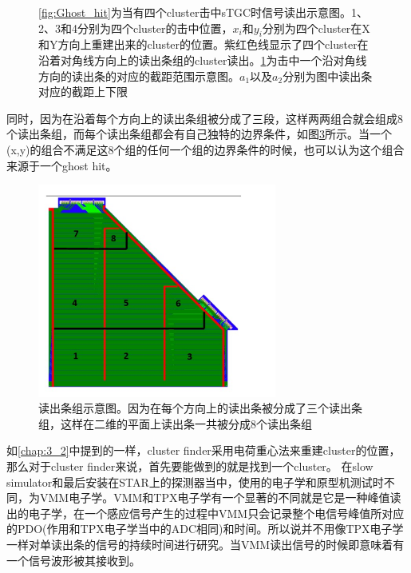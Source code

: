 \begin{figure}[htb]
\begin{subfigure}[b]{0.45\textwidth}
        \caption{}
        \label{fig:Reject_Ghost_Hit}
    \end{subfigure}
    \caption[Ghost hit原理及排除方法示意图]{\ref{fig:Ghost_hit}为当有四个cluster击中sTGC时信号读出示意图。1、2、3和4分别为四个cluster的击中位置，$x_i$和$y_i$分别为四个cluster在X和Y方向上重建出来的cluster的位置。紫红色线显示了四个cluster在沿着对角线方向上的读出条组的cluster读出。\ref{fig:Reject_Ghost_Hit}为击中一个沿对角线方向的读出条的对应的截距范围示意图。$a_1$以及$a_2$分别为图中读出条对应的截距上下限}
       \label{fig:Ghost_Hit_plots}
\end{figure}

同时，因为在沿着每个方向上的读出条组被分成了三段，这样两两组合就会组成8个读出条组，而每个读出条组都会有自己独特的边界条件，如图\ref{fig:Strip_Group}所示。当一个(x,y)的组合不满足这8个组的任何一个组的边界条件的时候，也可以认为这个组合来源于一个ghost hit。

\begin{figure}[htb]
    \begin{center}
    \includegraphics[width=0.7\textwidth,clip]{figures/Chapter3/Strip_Group.png}
    \end{center}
    \caption[读出条组示意图]{读出条组示意图。因为在每个方向上的读出条被分成了三个读出条组，这样在二维的平面上读出条一共被分成8个读出条组}
    \label{fig:Strip_Group}
\end{figure}

如\ref{chap:3_2}中提到的一样，cluster finder采用电荷重心法来重建cluster的位置，那么对于cluster finder来说，首先要能做到的就是找到一个cluster。
在slow simulator和最后安装在STAR上的探测器当中，使用的电子学和原型机测试时不同，为VMM电子学。VMM和TPX电子学有一个显著的不同就是它是一种峰值读出的电子学，在一个感应信号产生的过程中VMM只会记录整个电信号峰值所对应的PDO(作用和TPX电子学当中的ADC相同)和时间。所以说并不用像TPX电子学一样对单读出条的信号的持续时间进行研究。当VMM读出信号的时候即意味着有一个信号波形被其接收到。

